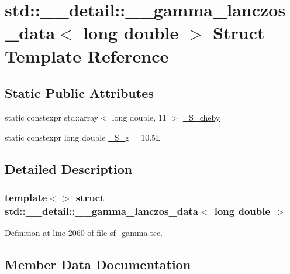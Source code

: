 \hypertarget{structstd_1_1____detail_1_1____gamma__lanczos__data_3_01long_01double_01_4}{}\section{std\+:\+:\+\_\+\+\_\+detail\+:\+:\+\_\+\+\_\+gamma\+\_\+lanczos\+\_\+data$<$ long double $>$ Struct Template Reference}
\label{structstd_1_1____detail_1_1____gamma__lanczos__data_3_01long_01double_01_4}
\subsection*{Static Public Attributes}
\begin{DoxyCompactItemize}
\item 
static constexpr std\+::array$<$ long double, 11 $>$ \hyperlink{structstd_1_1____detail_1_1____gamma__lanczos__data_3_01long_01double_01_4_a7968f4e72045e6a2b09244c678ddf3cc}{\+\_\+\+S\+\_\+cheby}
\item 
static constexpr long double \hyperlink{structstd_1_1____detail_1_1____gamma__lanczos__data_3_01long_01double_01_4_af86428283206e8b9bd3dc5709855c901}{\+\_\+\+S\+\_\+g} = 10.\+5L
\end{DoxyCompactItemize}


\subsection{Detailed Description}
\subsubsection*{template$<$$>$\newline
struct std\+::\+\_\+\+\_\+detail\+::\+\_\+\+\_\+gamma\+\_\+lanczos\+\_\+data$<$ long double $>$}



Definition at line 2060 of file sf\+\_\+gamma.\+tcc.



\subsection{Member Data Documentation}
\mbox{\label{structstd_1_1____detail_1_1____gamma__lanczos__data_3_01long_01double_01_4_a7968f4e72045e6a2b09244c678ddf3cc}} 
